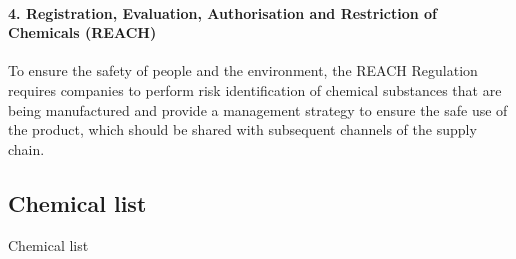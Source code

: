 \paragraph{4. Registration, Evaluation, Authorisation and Restriction of Chemicals (REACH) }
To ensure the safety of people and the environment, the REACH Regulation requires companies to perform risk identification of chemical substances that are being manufactured and provide a management strategy to ensure the safe use of the product, which should be shared with subsequent channels of the supply chain. 




\subsection{Chemical list}
\begin{table}[H]
\centering\footnotesize
\caption{Chemical list}
\label{tab:chemical-list}


\end{table}
